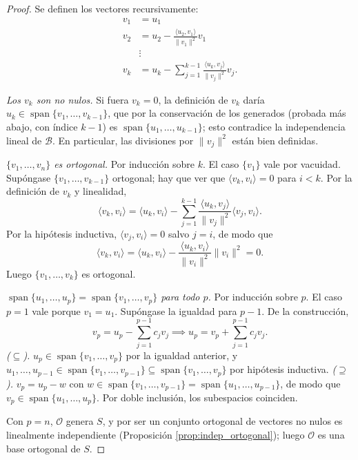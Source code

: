 \documentclass[11pt, a4paper]{article}
\begin{document}
\begin{proof}
Se definen los vectores recursivamente:
\begin{align*}
v_1 &= u_1 \\
v_2 &= u_2 - \frac{\langle u_2, v_1 \rangle}{\|v_1\|^2} v_1 \\
&\vdots \\
v_k &= u_k - \sum_{j=1}^{k-1} \frac{\langle u_k, v_j \rangle}{\|v_j\|^2} v_j.
\end{align*}

\textit{Los $v_k$ son no nulos.} Si fuera $v_k = 0$, la definición de $v_k$ daría
$u_k \in \operatorname{span}\{v_1, \dots, v_{k-1}\}$, que por la conservación de los generados
(probada más abajo, con índice $k-1$) es $\operatorname{span}\{u_1, \dots, u_{k-1}\}$; esto
contradice la independencia lineal de $\mathcal{B}$. En particular, las divisiones por
$\|v_j\|^2$ están bien definidas.

\textit{$\{v_1, \dots, v_n\}$ es ortogonal.} Por inducción sobre $k$. El caso $\{v_1\}$ vale por vacuidad. Supóngase $\{v_1, \dots, v_{k-1}\}$ ortogonal; hay que ver que $\langle v_k, v_i \rangle = 0$ para $i < k$. Por la definición de $v_k$ y linealidad,
\[
\langle v_k, v_i \rangle = \langle u_k, v_i \rangle - \sum_{j=1}^{k-1} \frac{\langle u_k, v_j \rangle}{\|v_j\|^2} \langle v_j, v_i \rangle.
\]
Por la hipótesis inductiva, $\langle v_j, v_i \rangle = 0$ salvo $j = i$, de modo que
\[
\langle v_k, v_i \rangle = \langle u_k, v_i \rangle - \frac{\langle u_k, v_i \rangle}{\|v_i\|^2} \|v_i\|^2 = 0.
\]
Luego $\{v_1, \dots, v_k\}$ es ortogonal.

\textit{$\operatorname{span}\{u_1, \dots, u_p\} = \operatorname{span}\{v_1, \dots, v_p\}$ para todo $p$.} Por inducción sobre $p$. El caso $p = 1$ vale porque $v_1 = u_1$. Supóngase la igualdad para $p-1$. De la construcción,
\[
v_p = u_p - \sum_{j=1}^{p-1} c_j v_j \implies u_p = v_p + \sum_{j=1}^{p-1} c_j v_j.
\]
\textit{($\subseteq$).} $u_p \in \operatorname{span}\{v_1, \dots, v_p\}$ por la igualdad anterior, y $u_1, \dots, u_{p-1} \in \operatorname{span}\{v_1, \dots, v_{p-1}\} \subseteq \operatorname{span}\{v_1, \dots, v_p\}$ por hipótesis inductiva. \textit{($\supseteq$).} $v_p = u_p - w$ con $w \in \operatorname{span}\{v_1, \dots, v_{p-1}\} = \operatorname{span}\{u_1, \dots, u_{p-1}\}$, de modo que $v_p \in \operatorname{span}\{u_1, \dots, u_p\}$. Por doble inclusión, los subespacios coinciden.

Con $p = n$, $\mathcal{O}$ genera $S$, y por ser un conjunto ortogonal de vectores no nulos es linealmente independiente (Proposición \ref{prop:indep_ortogonal}); luego $\mathcal{O}$ es una base ortogonal de $S$.
\end{proof}
\end{document}
